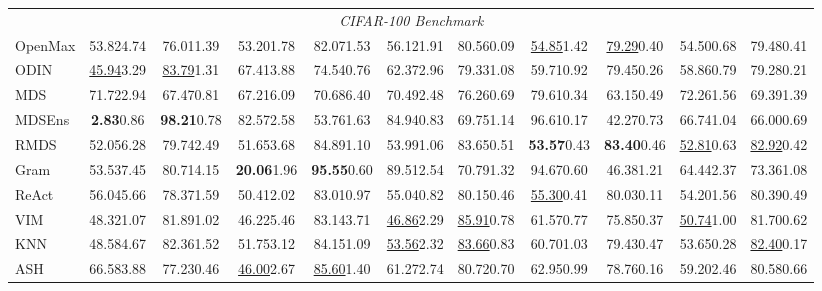 \documentclass{article} \usepackage{iclr2024_conference,times}
\begin{document}
\begin{table*}
{\begin{tabular}{l cc cc cc cc cc}
			\multicolumn{11}{c}{\emph{CIFAR-100 Benchmark}} \\
OpenMax & 53.82{\tiny4.74} &  76.01{\tiny1.39} &  53.20{\tiny1.78} &  82.07{\tiny1.53} &  56.12{\tiny1.91} &  80.56{\tiny0.09} &  \underline{54.85}{\tiny1.42} &  \underline{79.29}{\tiny0.40} &  54.50{\tiny0.68} &  79.48{\tiny0.41 }\\ 
ODIN & \underline{45.94}{\tiny3.29} &  \underline{83.79}{\tiny1.31} &  67.41{\tiny3.88} &  74.54{\tiny0.76} &  62.37{\tiny2.96} &  79.33{\tiny1.08} &  59.71{\tiny0.92} &  79.45{\tiny0.26} &  58.86{\tiny0.79} &  79.28{\tiny0.21 }\\ 
			MDS & 71.72{\tiny2.94} &  67.47{\tiny0.81} &  67.21{\tiny6.09} &  70.68{\tiny6.40} &  70.49{\tiny2.48} &  76.26{\tiny0.69} &  79.61{\tiny0.34} &  63.15{\tiny0.49} &  72.26{\tiny1.56} &  69.39{\tiny1.39 }\\ 
			MDSEns & \textbf{2.83}{\tiny0.86} &  \textbf{98.21}{\tiny0.78} &  82.57{\tiny2.58} &  53.76{\tiny1.63} &  84.94{\tiny0.83} &  69.75{\tiny1.14} &  96.61{\tiny0.17} &  42.27{\tiny0.73} &  66.74{\tiny1.04} &  66.00{\tiny0.69 }\\ 
			RMDS & 52.05{\tiny6.28} &  79.74{\tiny2.49} &  51.65{\tiny3.68} &  84.89{\tiny1.10} &  53.99{\tiny1.06} &  83.65{\tiny0.51} &  \textbf{53.57}{\tiny0.43} &  \textbf{83.40}{\tiny0.46} &  \underline{52.81}{\tiny0.63} &  \underline{82.92}{\tiny0.42 }\\ 
			Gram & 53.53{\tiny7.45} &  80.71{\tiny4.15} &  \textbf{20.06}{\tiny1.96} &  \textbf{95.55}{\tiny0.60} &  89.51{\tiny2.54} &  70.79{\tiny1.32} &  94.67{\tiny0.60} &  46.38{\tiny1.21} &  64.44{\tiny2.37} &  73.36{\tiny1.08 }\\ 
ReAct & 56.04{\tiny5.66} &  78.37{\tiny1.59} &  50.41{\tiny2.02} &  83.01{\tiny0.97} &  55.04{\tiny0.82} &  80.15{\tiny0.46} &  \underline{55.30}{\tiny0.41} &  80.03{\tiny0.11} &  54.20{\tiny1.56} &  80.39{\tiny0.49 }\\ 
VIM & 48.32{\tiny1.07} &  81.89{\tiny1.02} &  46.22{\tiny5.46} &  83.14{\tiny3.71} &  \underline{46.86}{\tiny2.29} &  \underline{85.91}{\tiny0.78} &  61.57{\tiny0.77} &  75.85{\tiny0.37} &  \underline{50.74}{\tiny1.00} &  81.70{\tiny0.62 }\\ 
			KNN & 48.58{\tiny4.67} &  82.36{\tiny1.52} &  51.75{\tiny3.12} &  84.15{\tiny1.09} &  \underline{53.56}{\tiny2.32} &  \underline{83.66}{\tiny0.83} &  60.70{\tiny1.03} &  79.43{\tiny0.47} &  53.65{\tiny0.28} &  \underline{82.40}{\tiny0.17 }\\ 
ASH & 66.58{\tiny3.88} &  77.23{\tiny0.46} &  \underline{46.00}{\tiny2.67} &  \underline{85.60}{\tiny1.40} &  61.27{\tiny2.74} &  80.72{\tiny0.70} &  62.95{\tiny0.99} &  78.76{\tiny0.16} &  59.20{\tiny2.46} &  80.58{\tiny0.66 }\\ 

\end{tabular}}
\end{table*}
\end{document}
